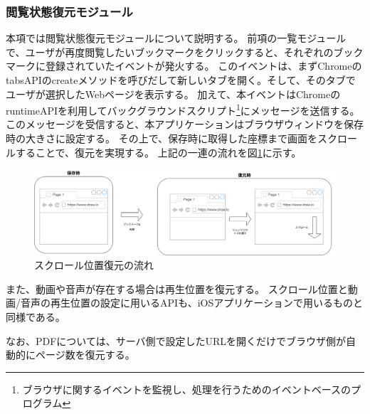 \subsubsection{閲覧状態復元モジュール}
本項では閲覧状態復元モジュールについて説明する。
前項の一覧モジュールで、ユーザが再度閲覧したいブックマークをクリックすると、それぞれのブックマークに登録されていたイベントが発火する。
このイベントは、まずChromeのtabsAPIのcreateメソッドを呼びだして新しいタブを開く。そして、そのタブでユーザが選択したWebページを表示する。
加えて、本イベントはChromeのruntimeAPI\cite{chrome-runtime-api}を利用してバックグラウンドスクリプト\footnote{ブラウザに関するイベントを監視し、処理を行うためのイベントベースのプログラム}にメッセージを送信する。
このメッセージを受信すると、本アプリケーションはブラウザウィンドウを保存時の大きさに設定する。
その上で、保存時に取得した座標まで画面をスクロールすることで、復元を実現する。
上記の一連の流れを図\ref{fig:impl-scroll-position-flow}に示す。

\begin{figure}[htbp]
  \caption{スクロール位置復元の流れ}
  \label{fig:impl-scroll-position-flow}
  \begin{center}
    \includegraphics[bb=0 0 1421 404,width=15cm]{img/050_implementation/chrome/impl-scroll-position-flow.pdf}
  \end{center}
\end{figure}


また、動画や音声が存在する場合は再生位置を復元する。
スクロール位置と動画/音声の再生位置の設定に用いるAPIも、iOSアプリケーションで用いるものと同様である。

なお、PDFについては、サーバ側で設定したURLを開くだけでブラウザ側が自動的にページ数を復元する。

